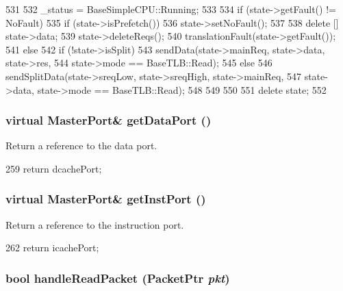 \begin{DoxyCode}
531 {
532     _status = BaseSimpleCPU::Running;
533 
534     if (state->getFault() != NoFault) {
535         if (state->isPrefetch()) {
536             state->setNoFault();
537         }
538         delete [] state->data;
539         state->deleteReqs();
540         translationFault(state->getFault());
541     } else {
542         if (!state->isSplit) {
543             sendData(state->mainReq, state->data, state->res,
544                      state->mode == BaseTLB::Read);
545         } else {
546             sendSplitData(state->sreqLow, state->sreqHigh, state->mainReq,
547                           state->data, state->mode == BaseTLB::Read);
548         }
549     }
550 
551     delete state;
552 }
\end{DoxyCode}
\hypertarget{classTimingSimpleCPU_aeea6b55ae1c4be53c21dbee434b221d4}{
\subsubsection[{getDataPort}]{\setlength{\rightskip}{0pt plus 5cm}virtual {\bf MasterPort}\& getDataPort ()}}
\label{classTimingSimpleCPU_aeea6b55ae1c4be53c21dbee434b221d4}
Return a reference to the data port. 


\begin{DoxyCode}
259 { return dcachePort; }
\end{DoxyCode}
\hypertarget{classTimingSimpleCPU_a40da530cb5dd380fd7fc0d786e94d5eb}{
\subsubsection[{getInstPort}]{\setlength{\rightskip}{0pt plus 5cm}virtual {\bf MasterPort}\& getInstPort ()}}
\label{classTimingSimpleCPU_a40da530cb5dd380fd7fc0d786e94d5eb}
Return a reference to the instruction port. 


\begin{DoxyCode}
262 { return icachePort; }
\end{DoxyCode}
\hypertarget{classTimingSimpleCPU_a9a8beb0dcad34e8759794cea6639f715}{
\subsubsection[{handleReadPacket}]{\setlength{\rightskip}{0pt plus 5cm}bool handleReadPacket ({\bf PacketPtr} {\em pkt})}}
\label{classTimingSimpleCPU_a9a8beb0dcad34e8759794cea6639f715}



